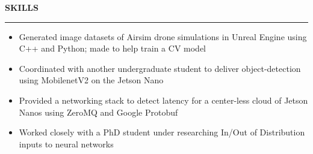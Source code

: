 \documentclass[12pt, a4paper]{article}
\begin{document}
\vspace{0cm}
%
%
\textbf{{\fontsize{12}{14}\selectfont SKILLS}}\newline
\vspace{-0.8cm}\newline
\rule{18.5cm}{0.4pt}
%
%
\vspace{-\topsep}
\begin{itemize}
  \setlength{\itemindent}{-6mm}
  \vspace{-0.2cm}\item Generated image datasets of Airsim drone simulations in Unreal Engine using C++ and Python; made to help train a CV model
  \vspace{-0.2cm}\item Coordinated with another undergraduate student to deliver object-detection using MobilenetV2 on the Jetson Nano
  \vspace{-0.2cm}\item Provided a networking stack to detect latency for a center-less cloud of Jetson Nanos using ZeroMQ and Google Protobuf
  \vspace{-0.2cm}\item Worked closely with a PhD student under researching In/Out of Distribution inputs to neural networks
\end{itemize}
\vspace{0cm}
\end{document}
